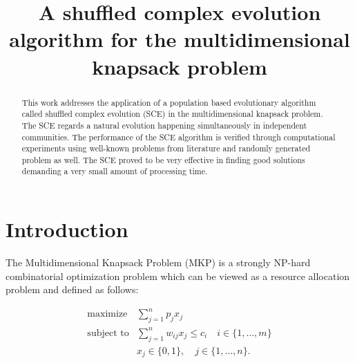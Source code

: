 \documentclass[10pt,conference, compsocconf]{IEEEtran}
\begin{document}
\title{A shuffled complex evolution algorithm for
the multidimensional knapsack problem}

\author{
\and
{}
}

\maketitle

\begin{abstract}
This work addresses the application of
a population based evolutionary algorithm
called shuffled complex evolution (SCE) in the multidimensional knapsack
problem.
The SCE regards a natural evolution happening simultaneously in independent communities.
The performance of the SCE algorithm is verified through computational experiments
using well-known problems from literature and randomly generated problem as well.
The SCE proved to be very effective in finding good solutions demanding a
very small amount of processing time.
\end{abstract}
\IEEEpeerreviewmaketitle

\section{Introduction}
\label{sec:intro}

The Multidimensional Knapsack Problem (MKP) is a strongly NP-hard combinatorial
optimization problem which can be viewed as a resource allocation problem and
defined as follows:

\begin{align*}
  \text{maximize} & \sum_{j=1}^n p_j x_j \\
  \text{subject to} & \sum_{j=1}^n w_{ij} x_j \leqslant c_i \quad i \in \{1, \ldots, m\}\\
   & x_j \in \{0, 1\}, \quad j \in \{1, \ldots, n\}.
\end{align*}
\end{document}
